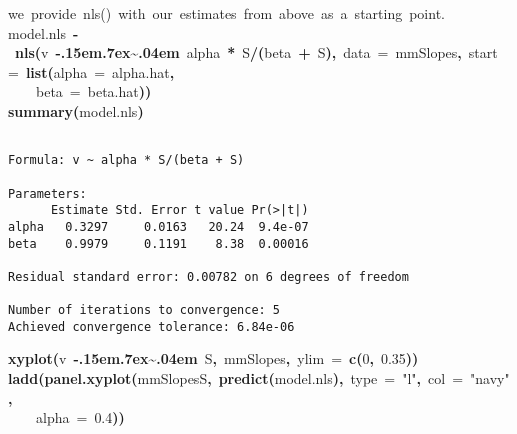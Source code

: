 \documentclass{article}\usepackage{graphicx, color}
\makeatletter
\newcommand{\hlnumber}[1]{\textcolor[rgb]{0,0,0}{#1}}%
\newcommand{\hlfunctioncall}[1]{\textcolor[rgb]{0.501960784313725,0,0.329411764705882}{\textbf{#1}}}%
\newcommand{\hlstring}[1]{\textcolor[rgb]{0.6,0.6,1}{#1}}%
\newcommand{\hlkeyword}[1]{\textcolor[rgb]{0,0,0}{\textbf{#1}}}%
\newcommand{\hlargument}[1]{\textcolor[rgb]{0.690196078431373,0.250980392156863,0.0196078431372549}{#1}}%
\newcommand{\hlcomment}[1]{\textcolor[rgb]{0.180392156862745,0.6,0.341176470588235}{#1}}%
\newcommand{\hlassignement}[1]{\textcolor[rgb]{0,0,0}{\textbf{#1}}}%
\newcommand{\hlsymbol}[1]{\textcolor[rgb]{0,0,0}{#1}}%
\def\urltilda{\kern -.15em\lower .7ex\hbox{\~{}}\kern .04em}%
\newcommand{\hlstd}[1]{\textcolor[rgb]{0,0,0}{#1}}%
\newenvironment{kframe}{%
 \def\FrameCommand##1{\hskip\@totalleftmargin \hskip-\fboxsep
 \colorbox{shadecolor}{##1}\hskip-\fboxsep
     \hskip-\linewidth \hskip-\@totalleftmargin \hskip\columnwidth}%
 \MakeFramed {\advance\hsize-\width
   \@totalleftmargin\z@ \linewidth\hsize
   \@setminipage}}%
 {\par\unskip\endMakeFramed}
\newenvironment{knitrout}{}{} %
\makeatother
\begin{document}
\begin{knitrout}
\color{fgcolor}\begin{kframe}
\begin{flushleft}
\ttfamily\noindent
\hlcomment{\usebox{\hlnormalsizeboxhash}{\ }we{\ }provide{\ }nls(){\ }with{\ }our{\ }estimates{\ }from{\ }above{\ }as{\ }a{\ }starting{\ }point.}\hspace*{\fill}\\
\hlstd{}\hlsymbol{model.nls}{\ }\hlassignement{\usebox{\hlnormalsizeboxlessthan}-}{\ }\hlfunctioncall{nls}\hlkeyword{(}\hlsymbol{v}{\ }\hlkeyword{\urltilda{}}{\ }\hlsymbol{alpha}{\ }\hlkeyword{*}{\ }\hlsymbol{S}\hlkeyword{/}\hlkeyword{(}\hlsymbol{beta}{\ }\hlkeyword{+}{\ }\hlsymbol{S}\hlkeyword{)}\hlkeyword{,}{\ }\hlargument{data}{\ }\hlargument{=}{\ }\hlsymbol{mmSlopes}\hlkeyword{,}{\ }\hlargument{start}{\ }\hlargument{=}{\ }\hlfunctioncall{list}\hlkeyword{(}\hlargument{alpha}{\ }\hlargument{=}{\ }\hlsymbol{alpha.hat}\hlkeyword{,}\hspace*{\fill}\\
\hlstd{}{\ }{\ }{\ }{\ }\hlargument{beta}{\ }\hlargument{=}{\ }\hlsymbol{beta.hat}\hlkeyword{)}\hlkeyword{)}\hspace*{\fill}\\
\hlstd{}\hlfunctioncall{summary}\hlkeyword{(}\hlsymbol{model.nls}\hlkeyword{)}\mbox{}
\normalfont
\end{flushleft}
\begin{verbatim}

Formula: v ~ alpha * S/(beta + S)

Parameters:
      Estimate Std. Error t value Pr(>|t|)
alpha   0.3297     0.0163   20.24  9.4e-07
beta    0.9979     0.1191    8.38  0.00016

Residual standard error: 0.00782 on 6 degrees of freedom

Number of iterations to convergence: 5 
Achieved convergence tolerance: 6.84e-06 

\end{verbatim}
\begin{flushleft}
\ttfamily\noindent
\hlfunctioncall{xyplot}\hlkeyword{(}\hlsymbol{v}{\ }\hlkeyword{\urltilda{}}{\ }\hlsymbol{S}\hlkeyword{,}{\ }\hlsymbol{mmSlopes}\hlkeyword{,}{\ }\hlargument{ylim}{\ }\hlargument{=}{\ }\hlfunctioncall{c}\hlkeyword{(}\hlnumber{0}\hlkeyword{,}{\ }\hlnumber{0.35}\hlkeyword{)}\hlkeyword{)}\hspace*{\fill}\\
\hlstd{}\hlfunctioncall{ladd}\hlkeyword{(}\hlfunctioncall{panel.xyplot}\hlkeyword{(}\hlsymbol{mmSlopes}\hlkeyword{\usebox{\hlnormalsizeboxdollar}}\hlsymbol{S}\hlkeyword{,}{\ }\hlfunctioncall{predict}\hlkeyword{(}\hlsymbol{model.nls}\hlkeyword{)}\hlkeyword{,}{\ }\hlargument{type}{\ }\hlargument{=}{\ }\hlstring{"{}{}l"{}{}}\hlkeyword{,}{\ }\hlargument{col}{\ }\hlargument{=}{\ }\hlstring{"{}{}navy"{}{}}\hlkeyword{,}\hspace*{\fill}\\
\hlstd{}{\ }{\ }{\ }{\ }\hlargument{alpha}{\ }\hlargument{=}{\ }\hlnumber{0.4}\hlkeyword{)}\hlkeyword{)}\mbox{}
\normalfont
\end{flushleft}
\end{kframe}


\end{knitrout}
\end{document}
